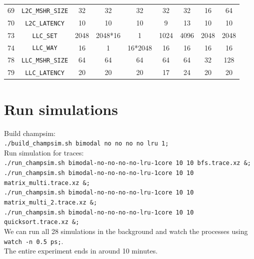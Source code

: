 \documentclass[11pt, swedish, openany]{book}
\begin{document}
\begin{table}[H]
\begin{tabular}{||c|c||c||c|c||c|c||c|c||}
        69                    & \texttt{L2C\_MSHR\_SIZE}   & 32                        & 32      & 32          & 32      & 32      & 16      & 64      \\
        70                    & \texttt{L2C\_LATENCY}      & 10                        & 10      & 10          & 9       & 13      & 10      & 10      \\
        \hline
        73                    & \texttt{LLC\_SET}          & 2048                      & 2048*16 & 1           & 1024    & 4096    & 2048    & 2048    \\
        74                    & \texttt{LLC\_WAY}          & 16                        & 1       & 16*2048     & 16      & 16      & 16      & 16      \\
        78                    & \texttt{LLC\_MSHR\_SIZE}   & 64                        & 64      & 64          & 64      & 64      & 32      & 128     \\
        79                    & \texttt{LLC\_LATENCY}      & 20                        & 20      & 20          & 17      & 24      & 20      & 20      \\
        \hline
    \end{tabular}
\end{table}


\section{Run simulations}

Build champsim: \\
\texttt{./build\_champsim.sh bimodal no no no no lru 1;} \\
Run simulation for traces: \\
\texttt{./run\_champsim.sh bimodal-no-no-no-no-lru-1core 10 10 bfs.trace.xz \&;} \\
\texttt{./run\_champsim.sh bimodal-no-no-no-no-lru-1core 10 10 matrix\_multi.trace.xz \&;} \\
\texttt{./run\_champsim.sh bimodal-no-no-no-no-lru-1core 10 10 matrix\_multi\_2.trace.xz \&;} \\
\texttt{./run\_champsim.sh bimodal-no-no-no-no-lru-1core 10 10 quicksort.trace.xz \&;} \\

We can run all 28 simulations in the background and watch the processes using \texttt{watch -n 0.5 ps;}. \\
The entire experiment ends in around 10 minutes.
\end{document}
